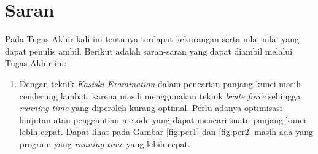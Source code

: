   \section{Saran}
  Pada Tugas Akhir kali ini tentunya terdapat kekurangan serta nilai-nilai yang dapat penulis ambil. Berikut adalah saran-saran yang dapat diambil melalui Tugas Akhir ini:
  \begin{enumerate}
    \item Dengan teknik \textit{Kasiski Examination} dalam pencarian panjang kunci masih cenderung lambat, karena masih menggunakan teknik \textit{brute force} sehingga \textit{running time} yang diperoleh kurang optimal. Perlu adanya optimisasi lanjutan atau penggantian metode yang dapat mencari suatu panjang kunci lebih cepat. Dapat lihat pada Gambar \ref{fig:per1} dan \ref{fig:per2} masih ada yang program yang \textit{running time} yang lebih cepat.%
    
  \end{enumerate}
  
